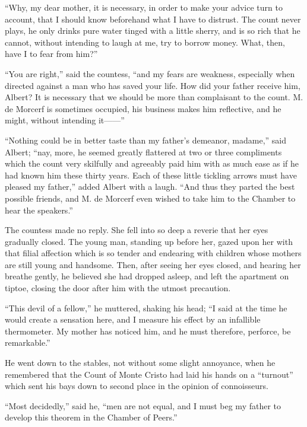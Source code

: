 “Why, my dear mother, it is necessary, in order to make your advice
turn to account, that I should know beforehand what I have to distrust.
The count never plays, he only drinks pure water tinged with a little
sherry, and is so rich that he cannot, without intending to laugh at
me, try to borrow money. What, then, have I to fear from him?”

“You are right,” said the countess, “and my fears are weakness,
especially when directed against a man who has saved your life. How did
your father receive him, Albert? It is necessary that we should be more
than complaisant to the count. M. de Morcerf is sometimes occupied, his
business makes him reflective, and he might, without intending it——”

“Nothing could be in better taste than my father’s demeanor, madame,”
said Albert; “nay, more, he seemed greatly flattered at two or three
compliments which the count very skilfully and agreeably paid him with
as much ease as if he had known him these thirty years. Each of these
little tickling arrows must have pleased my father,” added Albert with
a laugh. “And thus they parted the best possible friends, and M. de
Morcerf even wished to take him to the Chamber to hear the speakers.”

The countess made no reply. She fell into so deep a reverie that her
eyes gradually closed. The young man, standing up before her, gazed
upon her with that filial affection which is so tender and endearing
with children whose mothers are still young and handsome. Then, after
seeing her eyes closed, and hearing her breathe gently, he believed she
had dropped asleep, and left the apartment on tiptoe, closing the door
after him with the utmost precaution.

“This devil of a fellow,” he muttered, shaking his head; “I said at the
time he would create a sensation here, and I measure his effect by an
infallible thermometer. My mother has noticed him, and he must
therefore, perforce, be remarkable.”

He went down to the stables, not without some slight annoyance, when he
remembered that the Count of Monte Cristo had laid his hands on a
“turnout” which sent his bays down to second place in the opinion of
connoisseurs.

“Most decidedly,” said he, “men are not equal, and I must beg my father
to develop this theorem in the Chamber of Peers.”
